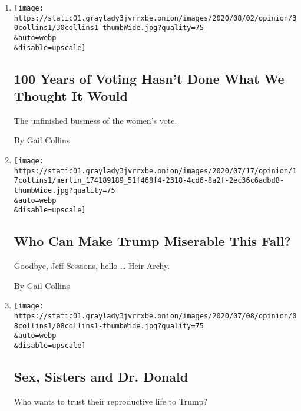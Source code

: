 \begin{enumerate}
\def\labelenumi{\arabic{enumi}.}
\item
  \href{/2020/07/30/opinion/19th-amendment-women-suffrage.html}{}

  \texttt{[image: https://static01.graylady3jvrrxbe.onion/images/2020/08/02/opinion/30collins1/30collins1-thumbWide.jpg?quality=75\\\&auto=webp\\\&disable=upscale]}

  \hypertarget{100-years-of-voting-hasnt-done-what-we-thought-it-would}{%
  \subsection{100 Years of Voting Hasn't Done What We Thought It
  Would}\label{100-years-of-voting-hasnt-done-what-we-thought-it-would}}

  The unfinished business of the women's vote.

  By Gail Collins
\item
  \href{/2020/07/15/opinion/trump-sessions-senate.html}{}

  \texttt{[image: https://static01.graylady3jvrrxbe.onion/images/2020/07/17/opinion/17collins1/merlin\_174189189\_51f468f4-2318-4cd6-8a2f-2ec36c6adbd8-thumbWide.jpg?quality=75\\\&auto=webp\\\&disable=upscale]}

  \hypertarget{who-can-make-trump-miserable-this-fall}{%
  \subsection{Who Can Make Trump Miserable This
  Fall?}\label{who-can-make-trump-miserable-this-fall}}

  Goodbye, Jeff Sessions, hello \ldots{} Heir Archy.

  By Gail Collins
\item
  \href{/2020/07/08/opinion/birth-control-supreme-court.html}{}

  \texttt{[image: https://static01.graylady3jvrrxbe.onion/images/2020/07/08/opinion/08collins1/08collins1-thumbWide.jpg?quality=75\\\&auto=webp\\\&disable=upscale]}

  \hypertarget{sex-sisters-and-dr-donald}{%
  \subsection{Sex, Sisters and Dr.
  Donald}\label{sex-sisters-and-dr-donald}}

  Who wants to trust their reproductive life to Trump?


\end{enumerate}
